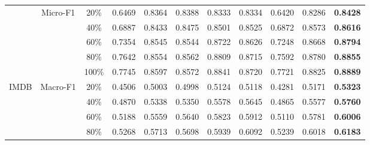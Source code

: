 \begin{table*}[t]
\begin{tabular}{|c|c|c|c|c|c|c|c|c|c|c|}
                        & \multirow{5}{*}{Micro-F1} & 20\%                        & 0.6469               & 0.8364               & 0.8388               & 0.8333                & 0.8334               & 0.6420                  & 0.8286               & \textbf{0.8428}       \\  
                        &                           & 40\%                        & 0.6887               & 0.8433               & 0.8475               & 0.8501                & 0.8525               & 0.6872                  & 0.8573               & \textbf{0.8616}       \\  
                        &                           & 60\%                        & 0.7354               & 0.8545               & 0.8544               & 0.8722                & 0.8626               & 0.7248                  & 0.8668               & \textbf{0.8794}       \\  
                        &                           & 80\%                        & 0.7642               & 0.8554               & 0.8562               & 0.8809                & 0.8715               & 0.7592                  & 0.8780               & \textbf{0.8855}       \\  
                        &                           & 100\%                       & 0.7745               & 0.8597               & 0.8572               & 0.8841                & 0.8720               & 0.7721                  & 0.8825               & \textbf{0.8889}       \\ \hline
\multirow{10}{*}{IMDB}  & \multirow{5}{*}{Macro-F1} & 20\%                        & 0.4506               & 0.5003               & 0.4998               & 0.5124                & 0.5118               & 0.4281                  & 0.5171               & \textbf{0.5323}       \\  
                        &                           & 40\%                        & 0.4870               & 0.5338               & 0.5350               & 0.5578                & 0.5645               & 0.4865                  & 0.5577               & \textbf{0.5760}       \\  
                        &                           & 60\%                        & 0.5188               & 0.5559               & 0.5640               & 0.5823                & 0.5912               & 0.5110                  & 0.5781               & \textbf{0.6006}       \\  
                        &                           & 80\%                        & 0.5268               & 0.5713               & 0.5698               & 0.5939                & 0.6092               & 0.5239                  & 0.6018               & \textbf{0.6183}       \\  

\end{tabular}
\end{table*}

